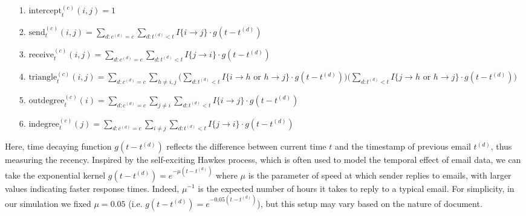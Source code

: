 \documentclass[a4paper]{article}
\begin{document}
 \begin{itemize}[leftmargin=*,rightmargin=-1cm]
 	\item [1.] $\mbox{intercept}^{(c)}_t(i, j) = 1$
 	\item [2.]  $\mbox{send}^{(c)}_t(i, j)=\sum\limits_{d: c^{(d)}=c}\sum\limits_{d: t^{(d)}<t} I\{i\rightarrow j\}\cdot g(t-t^{(d)})$
 	\item [3.] $\mbox{receive}^{(c)}_t(i, j)=\sum\limits_{d: c^{(d)}=c}\sum\limits_{d: t^{(d)}<t} I\{j\rightarrow i\}\cdot g(t-t^{(d)})$
 	\item [4.] $\mbox{triangle}^{(c)}_t(i, j)=\sum\limits_{d: c^{(d)}=c}\sum\limits_{h \neq i, j}\Big(\sum\limits_{d: t^{(d)}<t}  I\{i\rightarrow h \mbox{ or } h\rightarrow j \}\cdot g(t-t^{(d)})\Big)\Big(\sum\limits_{d: t^{(d)}<t} I\{j\rightarrow h \mbox{ or } h\rightarrow j\}\cdot g(t-t^{(d)})\Big)$
 	\item [5.]  $\mbox{outdegree}^{(c)}_t(i)=\sum\limits_{d: c^{(d)}=c}\sum\limits_{j\neq i}\sum\limits_{d: t^{(d)}<t} I\{i\rightarrow j\}\cdot g(t-t^{(d)})$
 	\item [6.] $\mbox{indegree}^{(c)}_t(j)=\sum\limits_{d: c^{(d)}=c}\sum\limits_{i \neq j}\sum\limits_{d: t^{(d)}<t} I\{j\rightarrow i\}\cdot g(t-t^{(d)})$
 \end{itemize}
 Here, time decaying function $g(t-t^{(d)})$ reflects the difference between current time $t$ and the timestamp of previous email $t^{(d)}$, thus measuring the recency. Inspired by the self-exciting Hawkes process, which is often used to model the temporal effect of email data, we can take the exponential kernel $g(t-t^{(d)})=e^{-\mu(t-t^{(d)})}$ where $\mu$ is the parameter of speed at
 which sender replies to emails, with larger values indicating faster response times. Indeed, $\mu^{-1}$ is the expected number of hours it takes to reply to a typical email. For simplicity, in our simulation we fixed $\mu=0.05$ (i.e. $g(t-t^{(d)})=e^{-0.05(t-t^{(d)})}$), but this setup may vary based on the nature of document.
\end{document}
